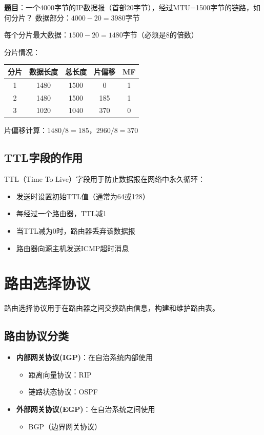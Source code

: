 \documentclass[12pt,a4paper,openany]{ctexbook}
\begin{document}
\begin{examplebox}[例题4.5 IP分片]
\textbf{题目}：一个4000字节的IP数据报（首部20字节），经过MTU=1500字节的链路，如何分片？
\tcblower
数据部分：$4000 - 20 = 3980$字节

每个分片最大数据：$1500 - 20 = 1480$字节（必须是8的倍数）

分片情况：
\begin{center}\small
\begin{tabular}{|c|c|c|c|c|}
\hline
分片 & 数据长度 & 总长度 & 片偏移 & MF \\
\hline
1 & 1480 & 1500 & 0 & 1 \\
2 & 1480 & 1500 & 185 & 1 \\
3 & 1020 & 1040 & 370 & 0 \\
\hline
\end{tabular}
\end{center}

片偏移计算：$1480/8=185$，$2960/8=370$
\end{examplebox}

\subsection{TTL字段的作用}
TTL（Time To Live）字段用于防止数据报在网络中永久循环：
\begin{itemize}[leftmargin=2em,itemsep=0pt]
    \item 发送时设置初始TTL值（通常为64或128）
    \item 每经过一个路由器，TTL减1
    \item 当TTL减为0时，路由器丢弃该数据报
    \item 路由器向源主机发送ICMP超时消息
\end{itemize}

\section{路由选择协议}
路由选择协议用于在路由器之间交换路由信息，构建和维护路由表。

\subsection{路由协议分类}
\begin{itemize}[leftmargin=2em,itemsep=0pt]
    \item \textbf{内部网关协议(IGP)}：在自治系统内部使用
    \begin{itemize}[itemsep=0pt]
        \item 距离向量协议：RIP
        \item 链路状态协议：OSPF
    \end{itemize}
    \item \textbf{外部网关协议(EGP)}：在自治系统之间使用
    \begin{itemize}[itemsep=0pt]
        \item BGP（边界网关协议）
    \end{itemize}
\end{itemize}
\end{document}
